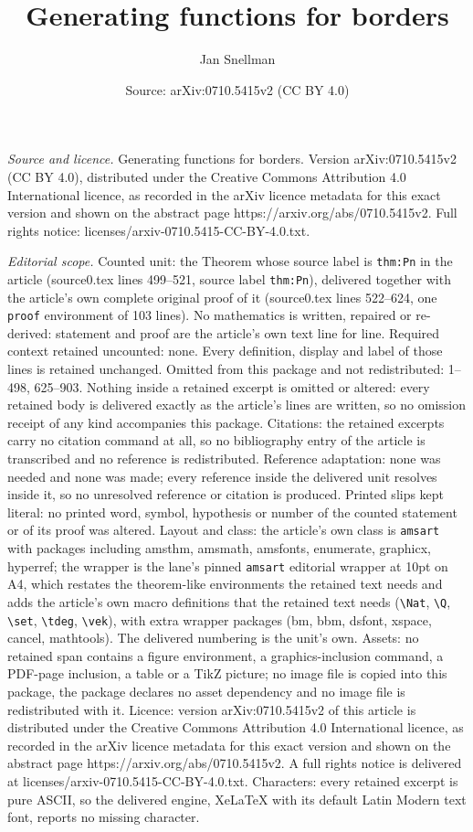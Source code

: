 \documentclass[10pt,a4paper]{amsart}
\title[Generating functions for borders]{Generating functions for borders}
\author{Jan Snellman}
\date{Source: arXiv:0710.5415v2 (CC BY 4.0)}
\begin{document}
\maketitle

\noindent\emph{Source and licence.} Generating functions for borders. Version arXiv:0710.5415v2 (CC BY 4.0), distributed under the Creative Commons Attribution 4.0 International licence, as recorded in the arXiv licence metadata for this exact version and shown on the abstract page https://arxiv.org/abs/0710.5415v2. Full rights notice: licenses/arxiv-0710.5415-CC-BY-4.0.txt.\par\smallskip

\noindent\textit{Editorial scope.} Counted unit: the Theorem whose source label is \texttt{thm:Pn} in the article (source0.tex lines 499--521, source label \texttt{thm:Pn}), delivered together with the article's own complete original proof of it (source0.tex lines 522--624, one \texttt{proof} environment of 103 lines). No mathematics is written, repaired or re-derived: statement and proof are the article's own text line for line. Required context retained uncounted: none. Every definition, display and label of those lines is retained unchanged. Omitted from this package and not redistributed: 1--498, 625--903. Nothing inside a retained excerpt is omitted or altered: every retained body is delivered exactly as the article's lines are written, so no omission receipt of any kind accompanies this package. Citations: the retained excerpts carry no citation command at all, so no bibliography entry of the article is transcribed and no reference is redistributed. Reference adaptation: none was needed and none was made; every reference inside the delivered unit resolves inside it, so no unresolved reference or citation is produced. Printed slips kept literal: no printed word, symbol, hypothesis or number of the counted statement or of its proof was altered. Layout and class: the article's own class is \texttt{amsart} with packages including amsthm, amsmath, amsfonts, enumerate, graphicx, hyperref; the wrapper is the lane's pinned \texttt{amsart} editorial wrapper at 10pt on A4, which restates the theorem-like environments the retained text needs and adds the article's own macro definitions that the retained text needs (\texttt{\textbackslash Nat}, \texttt{\textbackslash Q}, \texttt{\textbackslash set}, \texttt{\textbackslash tdeg}, \texttt{\textbackslash vek}), with extra wrapper packages (bm, bbm, dsfont, xspace, cancel, mathtools). The delivered numbering is the unit's own. Assets: no retained span contains a figure environment, a graphics-inclusion command, a PDF-page inclusion, a table or a TikZ picture; no image file is copied into this package, the package declares no asset dependency and no image file is redistributed with it. Licence: version arXiv:0710.5415v2 of this article is distributed under the Creative Commons Attribution 4.0 International licence, as recorded in the arXiv licence metadata for this exact version and shown on the abstract page https://arxiv.org/abs/0710.5415v2. A full rights notice is delivered at licenses/arxiv-0710.5415-CC-BY-4.0.txt. Characters: every retained excerpt is pure ASCII, so the delivered engine, XeLaTeX with its default Latin Modern text font, reports no missing character.
\end{document}
